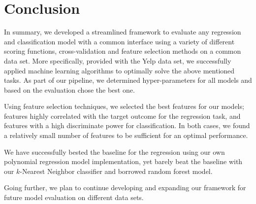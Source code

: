 \section{Conclusion}
\label{sec:five}

In summary, we developed a streamlined framework to evaluate any regression and
classification model with a common interface using a variety of different
scoring functions, cross-validation and feature selection methods on a common
data set.  More specifically, provided with the Yelp data set, we successfully
applied machine learning algorithms to optimally solve the above mentioned
tasks.  As part of our pipeline, we determined hyper-parameters for all models
and based on the evaluation chose the best one.

Using feature selection techniques, we selected the best features for our
models; features highly correlated with the target outcome for the regression
task, and features with a high discriminate power for classification.  In both
cases, we found a relatively small number of features to be sufficient for an
optimal performance.

We have successfully bested the baseline for the regression using our own
polynomial regression model implementation, yet barely beat the baseline with
our $k$-Nearest Neighbor classifier and borrowed random forest model.

Going further, we plan to continue developing and expanding our framework for
future model evaluation on different data sets.

